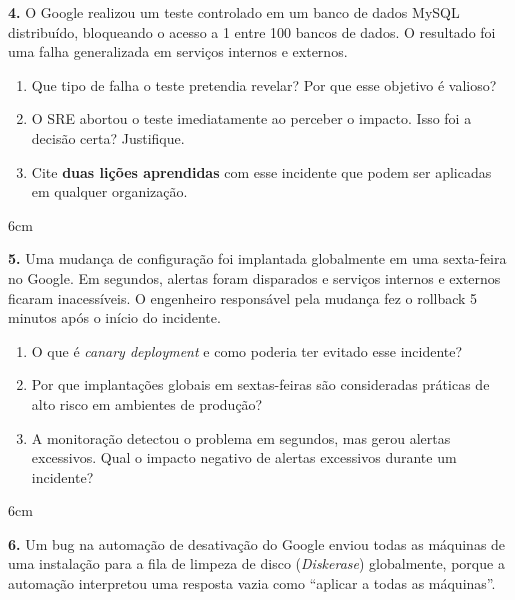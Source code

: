 \documentclass[12pt]{article}
\begin{document}
\textbf{4.} O Google realizou um teste controlado em um banco de dados MySQL distribuído,
bloqueando o acesso a 1 entre 100 bancos de dados. O resultado foi uma falha generalizada
em serviços internos e externos.

\begin{enumerate}[label=\alph*)]
  \item Que tipo de falha o teste pretendia revelar? Por que esse objetivo é valioso?
  \item O SRE abortou o teste imediatamente ao perceber o impacto. Isso foi a decisão
        certa? Justifique.
  \item Cite \textbf{duas lições aprendidas} com esse incidente que podem ser aplicadas
        em qualquer organização.
\end{enumerate}
\begin{resposta}{6cm}
\end{resposta}

\vspace{0.5cm}

\textbf{5.} Uma mudança de configuração foi implantada globalmente em uma sexta-feira
no Google. Em segundos, alertas foram disparados e serviços internos e externos ficaram
inacessíveis. O engenheiro responsável pela mudança fez o rollback 5 minutos após o
início do incidente.

\begin{enumerate}[label=\alph*)]
  \item O que é \textit{canary deployment} e como poderia ter evitado esse incidente?
  \item Por que implantações globais em sextas-feiras são consideradas práticas de
        alto risco em ambientes de produção?
  \item A monitoração detectou o problema em segundos, mas gerou alertas excessivos.
        Qual o impacto negativo de alertas excessivos durante um incidente?
\end{enumerate}
\begin{resposta}{6cm}
\end{resposta}

\vspace{0.5cm}

\textbf{6.} Um bug na automação de desativação do Google enviou todas as máquinas de
uma instalação para a fila de limpeza de disco (\textit{Diskerase}) globalmente, porque a
automação interpretou uma resposta vazia como ``aplicar a todas as máquinas''.
\end{document}
